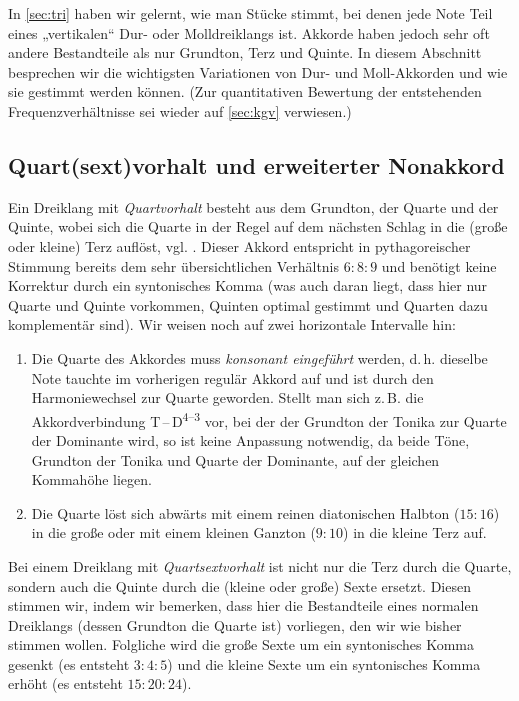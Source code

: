 In \cref{sec:tri} haben wir gelernt, wie man Stücke stimmt, bei denen jede Note
Teil eines „vertikalen“ Dur- oder Molldreiklangs ist. Akkorde haben jedoch sehr
oft andere Bestandteile als nur Grundton, Terz und Quinte. In diesem Abschnitt
besprechen wir die wichtigsten Variationen von Dur- und Moll-Akkorden und wie
sie gestimmt werden können. (Zur quantitativen Bewertung der entstehenden
Frequenzverhältnisse sei wieder auf \cref{sec:kgv} verwiesen.)

\subsection{Quart(sext)vorhalt und erweiterter Nonakkord}
\label{sec:49}

Ein Dreiklang mit \emph{Quartvorhalt} besteht aus dem Grundton, der Quarte und
der Quinte, wobei sich die Quarte in der Regel auf dem nächsten Schlag in die
(große oder kleine) Terz auflöst, vgl. \cite[{}8.2]{Skript}. Dieser Akkord
entspricht in pythagoreischer Stimmung bereits dem sehr übersichtlichen
Verhältnis $6:8:9$ und benötigt keine Korrektur durch ein syntonisches Komma
(was auch daran liegt, dass hier nur Quarte und Quinte vorkommen, Quinten
optimal gestimmt und Quarten dazu komplementär sind).  Wir weisen noch auf zwei
horizontale Intervalle hin:
\begin{enumerate}
\item Die Quarte des Akkordes muss \emph{konsonant eingeführt} werden,
  d.\,h. dieselbe Note tauchte im vorherigen regulär Akkord auf und ist durch
  den Harmoniewechsel zur Quarte geworden. Stellt man sich z.\,B. die
  Akkordverbindung T\,–\,D\textsuperscript{$4$–$3$} vor, bei der der Grundton
  der Tonika zur Quarte der Dominante wird, so ist keine Anpassung notwendig, da
  beide Töne, Grundton der Tonika und Quarte der Dominante, auf der gleichen
  Kommahöhe liegen.
\item Die Quarte löst sich abwärts mit einem reinen diatonischen Halbton
  ($15:16$) in die große oder mit einem kleinen Ganzton ($9:10$) in die
  kleine Terz auf.
\end{enumerate}
Bei einem Dreiklang mit \emph{Quartsextvorhalt} ist nicht nur die Terz durch die
Quarte, sondern auch die Quinte durch die (kleine oder große) Sexte ersetzt.
Diesen stimmen wir, indem wir bemerken, dass hier die Bestandteile eines
normalen Dreiklangs (dessen Grundton die Quarte ist) vorliegen, den wir wie
bisher stimmen wollen. Folgliche wird die große Sexte um ein syntonisches Komma
gesenkt (es entsteht $3:4:5$) und die kleine Sexte um ein syntonisches Komma
erhöht (es entsteht $15:20:24$).

